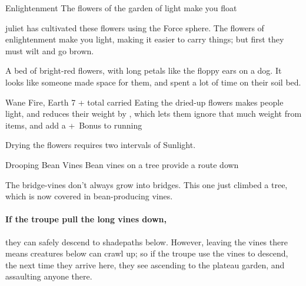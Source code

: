


{Enlightenment}%
{The flowers of the garden of light make you float}%
\label{lightFlowers}


\Gls{juliet} has cultivated these flowers using the Force \gls{sphere}.
The flowers of enlightenment make you light, making it easier to carry things; but first they must wilt and go brown.

\begin{boxtext}
  A bed of bright-red flowers, with long petals like the floppy ears on a dog.
  It looks like someone made space for them, and spent a lot of time on their soil bed.
\end{boxtext}

\label{flowerOfEnlightenment}
  {}%
  {Wane}%
  {Fire, Earth}%
  {7 + total  carried}%
  {Eating the dried-up flowers makes people light, and reduces their \gls{weight} by , which lets them ignore that much \gls{weight} from items, and add a +~Bonus to \gls{running}}%
  {\par%
    Drying the flowers requires two \glspl{interval} of Sunlight.
  }%

\showTalisman

{Drooping Bean Vines}%
{Bean vines on a tree provide a route down}%

The bridge-vines don't always grow into bridges.
This one just climbed a tree, which is now covered in bean-producing vines.

\paragraph{If the troupe pull the long vines down,}
they can safely descend to \gls{shadepaths} below.
However, leaving the vines there means creatures below can crawl up; so if the troupe use the vines to descend, the next time they arrive here, they see  ascending to the plateau garden, and assaulting anyone there.

